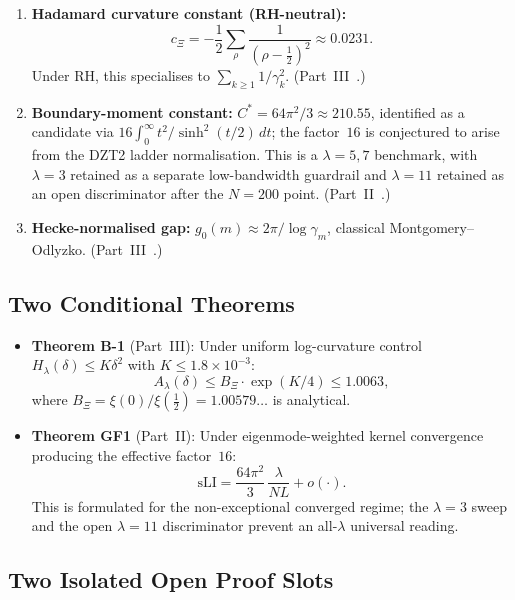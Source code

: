 \documentclass[12pt,a4paper]{article}
\theoremstyle{definition}
\theoremstyle{remark}
\begin{document}
\begin{enumerate}
  \item \textbf{Hadamard curvature constant (RH-neutral):}
    \[
      c_\Xi = -\frac{1}{2}\sum_\rho
              \frac{1}{(\rho-\tfrac{1}{2})^2}
            \approx 0.0231.
    \]
    Under RH, this specialises to $\sum_{k\geq 1} 1/\gamma_k^2$.
    (Part~III~\cite{Geiger2026partIII}.)

  \item \textbf{Boundary-moment constant:}
    $C^* = 64\pi^2/3 \approx 210.55$,
    identified as a candidate via
    $16\int_0^\infty t^2/\sinh^2(t/2)\,dt$; the factor~$16$ is
    conjectured to arise from the DZT2 ladder normalisation. This is a
    $\lambda=5,7$ benchmark, with $\lambda=3$ retained as a separate
    low-bandwidth guardrail and $\lambda=11$ retained as an open
    discriminator after the $N=200$ point.
    (Part~II~\cite{Geiger2026partII}.)

  \item \textbf{Hecke-normalised gap:}
    $g_0(m) \approx 2\pi/\log\gamma_m$, classical
    Montgomery--Odlyzko.
    (Part~III~\cite{Geiger2026partIII}.)
\end{enumerate}

\subsection{Two Conditional Theorems}

\begin{itemize}
  \item \textbf{Theorem B-1} (Part~III): Under uniform log-curvature
    control $H_\lambda(\delta) \leq K\delta^2$ with
    $K \leq 1.8\times 10^{-3}$:
    \[
      A_\lambda(\delta)
      \leq B_\Xi \cdot \exp(K/4) \leq 1.0063,
    \]
    where $B_\Xi = \xi(0)/\xi(\tfrac{1}{2}) = 1.00579\ldots$ is
    analytical.

  \item \textbf{Theorem GF1} (Part~II): Under eigenmode-weighted kernel
    convergence producing the effective factor~$16$:
    \[
      \mathrm{sLI}
      = \frac{64\pi^2}{3}\,\frac{\lambda}{NL} + o(\cdot).
    \]
    This is formulated for the non-exceptional converged regime; the
    $\lambda=3$ sweep and the open $\lambda=11$ discriminator prevent an
    all-$\lambda$ universal reading.
\end{itemize}


\subsection{Two Isolated Open Proof Slots}
\end{document}
